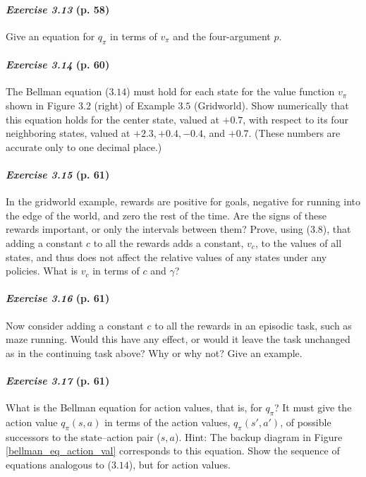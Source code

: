 \documentclass[10pt,a4paper]{article}
\begin{document}
\bigskip

\paragraph{\textit{Exercise 3.13} (p. 58)} Give an equation for $q_\pi$ in terms of $v_\pi$ and the four-argument $p$.

\bigskip


\paragraph{\textit{Exercise 3.14} (p. 60)} The Bellman equation ($3.14$) must hold for each state for the value function $v_\pi$ shown in Figure $3.2$ (right) of Example $3.5$ (Gridworld). Show numerically that this equation holds for the center state, valued at $+0.7$, with respect to its four neighboring states, valued at
$+2.3, +0.4, -0.4$, and $+0.7$. (These numbers are accurate only to one decimal place.)

\paragraph{\textit{Exercise 3.15} (p. 61)} In the gridworld example, rewards are positive for goals, negative for running into the edge of the world, and zero the rest of the time. Are the signs of these rewards important, or only the intervals between them? Prove, using ($3.8$), that adding a
constant $c$ to all the rewards adds a constant, $v_c$, to the values of all states, and thus does not affect the relative values of any states under any policies. What is $v_c$ in terms of $c$ and $\gamma$?

\paragraph{\textit{Exercise 3.16} (p. 61)} Now consider adding a constant $c$ to all the rewards in an episodic task, such as maze running. Would this have any effect, or would it leave the task unchanged as in the continuing task above? Why or why not? Give an example.

\paragraph{\textit{Exercise 3.17} (p. 61)} What is the Bellman equation for action values, that is, for $q_\pi$? It must give the action value $q_\pi(s, a)$ in terms of the action values, $q_\pi(s', a')$, of possible successors to the state–action pair ($s, a$).
Hint: The backup diagram in Figure  \ref{bellman_eq_action_val} corresponds to this equation.
Show the sequence of equations analogous to ($3.14$), but for action
values.
\end{document}

